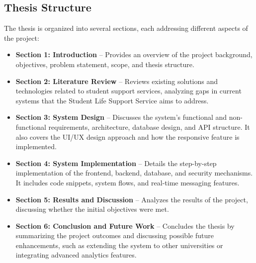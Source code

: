 \subsection{Thesis Structure}
The thesis is organized into several sections, each addressing different aspects of the project:
	\begin{itemize}
		\item \textbf{Section 1: Introduction} – Provides an overview of the project background, objectives, problem statement, scope, and thesis structure.
		
		\item \textbf{Section 2: Literature Review} – Reviews existing solutions and technologies related to student support services, analyzing gaps in current systems that the Student Life Support Service aims to address.
		
		\item \textbf{Section 3: System Design} – Discusses the system's functional and non-functional requirements, architecture, database design, and API structure. It also covers the UI/UX design approach and how the responsive feature is implemented.
		
		\item \textbf{Section 4: System Implementation} – Details the step-by-step implementation of the frontend, backend, database, and security mechanisms. It includes code snippets, system flows, and real-time messaging features.
		
		
		\item \textbf{Section 5: Results and Discussion} – Analyzes the results of the project, discussing whether the initial objectives were met.
		
		\item \textbf{Section 6: Conclusion and Future Work} – Concludes the thesis by summarizing the project outcomes and discussing possible future enhancements, such as extending the system to other universities or integrating advanced analytics features.
	\end{itemize}

